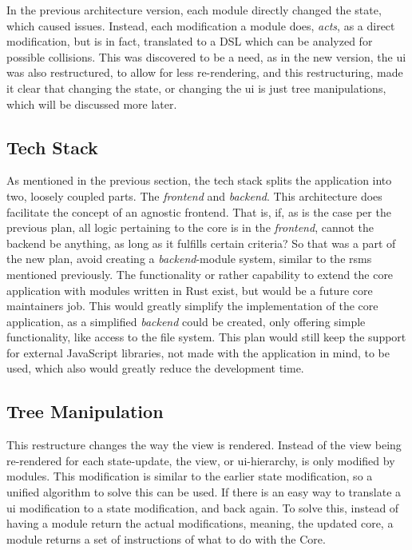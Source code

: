 In the previous architecture version, each module directly changed the state,
which caused issues. Instead, each modification a module does, \textit{acts}, as
a direct modification, but is in fact, translated to a DSL which can be analyzed
for possible collisions. This was discovered to be a need, as in the new
version, the \gls{ui} was also restructured, to allow for less re-rendering, and
this restructuring, made it clear that changing the state, or changing the
\gls{ui} is just tree manipulations, which will be discussed more later.


\subsection{Tech Stack}

As mentioned in the previous section, the tech stack splits the application into
two, loosely coupled parts. The \textit{frontend} and \textit{backend}. This
architecture does facilitate the concept of an agnostic frontend. That is, if,
as is the case per the previous plan, all logic pertaining to the core is in the
\textit{frontend}, cannot the backend be anything, as long as it fulfills
certain criteria?
So that was a part of the new plan, avoid creating a \textit{backend}-module
system, similar to the \gls{rsms} mentioned previously. The functionality or
rather capability to extend the core application with modules written in Rust
exist, but would be a future core maintainers job. This would greatly simplify
the implementation of the core application, as a simplified \textit{backend}
could be created, only offering simple functionality, like access to the file
system. This plan would still keep the support for external JavaScript
libraries, not made with the application in mind, to be used, which also would
greatly reduce the development time.

\subsection{Tree Manipulation}


This restructure changes the way the view is rendered. Instead of the view being
re-rendered for each state-update, the view, or \gls{ui}-hierarchy, is only
modified by modules. This modification is similar to the earlier state
modification, so a unified algorithm to solve this can be used. If there is an
easy way to translate a \gls{ui} modification to a state modification, and back
again. To solve this, instead of having a module return the actual
modifications, meaning, the updated core, a module returns a set of instructions
of what to do with the Core.

